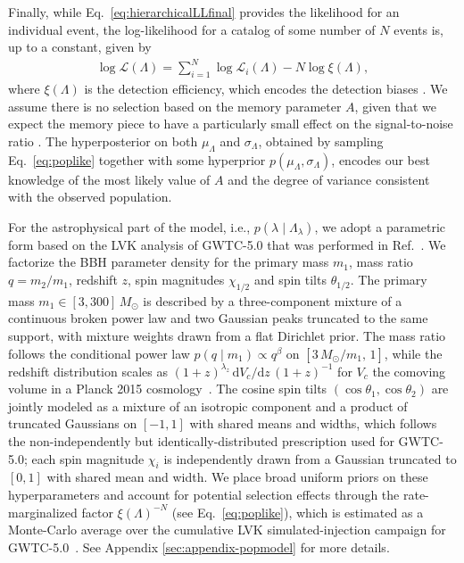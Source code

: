 \documentclass[aps,prd,reprint,twocolumn,10pt,eqsecnum,showpacs,nofootinbib,amsfonts,amssymb,amsmath,longbibliography,superscriptaddress,floatfix]{revtex4-1}
\begin{document}
Finally, while Eq.~\eqref{eq:hierarchicalLLfinal} provides the likelihood for an individual event, the log-likelihood for a catalog of some number of $N$ events is, up to a constant, given by 
\begin{align}
	\label{eq:poplike}
	\log\mathcal{L}(\Lambda) = \sum_{i=1}^{N}\log\mathcal{L}_{i}(\Lambda) - N \log \xi(\Lambda),
\end{align}
where $\xi(\Lambda)$ is the detection efficiency, which encodes the detection biases \cite{Mandel:2018mve}.
We assume there is no selection based on the memory parameter $A$, given that we expect the memory piece to have a particularly small effect on the signal-to-noise ratio \cite{Magee:2023muf}.
The hyperposterior on both $\mu_{\Lambda}$ and $\sigma_{\Lambda}$, obtained by sampling Eq.~\eqref{eq:poplike} together with some hyperprior $p(\mu_{\Lambda}, \sigma_{\Lambda})$, encodes our best knowledge of the most likely value of $A$ and the degree of variance consistent with the observed population.

For the astrophysical part of the model, i.e., $p(\lambda \mid \Lambda_\lambda)$, we adopt a parametric form based on the LVK analysis of GWTC-5.0 that was performed in Ref.~\cite{LIGOScientific:2026ctl}. We factorize the BBH parameter density for the primary mass $m_1$, mass ratio $q = m_2/m_1$, redshift $z$, spin magnitudes $\chi_{1/2}$ and spin tilts $\theta_{1/2}$. The primary mass $m_{1} \in [3, 300]\,M_{\odot}$ is described by a three-component mixture of a continuous broken power law and two Gaussian peaks truncated to the same support, with mixture weights drawn from a flat Dirichlet prior. The mass ratio follows the conditional power law $p(q \mid m_{1}) \propto q^{\beta}$ on $[3\,M_{\odot}/m_{1},\,1]$, while the redshift distribution scales as $(1+z)^{\lambda_{z}}\,\mathrm{d}V_{c}/\mathrm{d}z\,(1+z)^{-1}$ for $V_{c}$ the comoving volume in a Planck 2015 cosmology~\cite{Planck:2015fie}. The cosine spin tilts $(\cos\theta_{1}, \cos\theta_{2})$ are jointly modeled as a mixture of an isotropic component and a product of truncated Gaussians on $[-1, 1]$ with shared means and widths, which follows the non-independently but identically-distributed prescription used for GWTC-5.0; each spin magnitude $\chi_{i}$ is independently drawn from a Gaussian truncated to $[0, 1]$ with shared mean and width. We place broad uniform priors on these hyperparameters and account for potential selection effects through the rate-marginalized factor $\xi(\Lambda)^{-N}$ (see Eq.~\eqref{eq:poplike}), which is estimated as a Monte-Carlo average over the cumulative LVK simulated-injection campaign for GWTC-5.0~\cite{Essick:2025zed,LVK:GWTC5CumulativeSensitivity}. See Appendix \ref{sec:appendix-popmodel} for more details.
\end{document}
